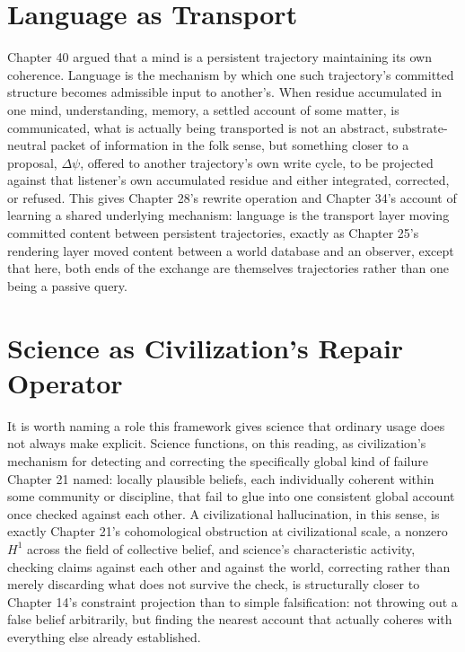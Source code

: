 \section{Language as Transport}

Chapter 40 argued that a mind is a persistent trajectory maintaining its own coherence. Language is the mechanism by which one such trajectory's committed structure becomes admissible input to another's. When residue accumulated in one mind, understanding, memory, a settled account of some matter, is communicated, what is actually being transported is not an abstract, substrate-neutral packet of information in the folk sense, but something closer to a proposal, \(\Delta\psi\), offered to another trajectory's own write cycle, to be projected against that listener's own accumulated residue and either integrated, corrected, or refused. This gives Chapter 28's rewrite operation and Chapter 34's account of learning a shared underlying mechanism: language is the transport layer moving committed content between persistent trajectories, exactly as Chapter 25's rendering layer moved content between a world database and an observer, except that here, both ends of the exchange are themselves trajectories rather than one being a passive query.

\section{Science as Civilization's Repair Operator}

It is worth naming a role this framework gives science that ordinary usage does not always make explicit. Science functions, on this reading, as civilization's mechanism for detecting and correcting the specifically global kind of failure Chapter 21 named: locally plausible beliefs, each individually coherent within some community or discipline, that fail to glue into one consistent global account once checked against each other. A civilizational hallucination, in this sense, is exactly Chapter 21's cohomological obstruction at civilizational scale, a nonzero \(H^1\) across the field of collective belief, and science's characteristic activity, checking claims against each other and against the world, correcting rather than merely discarding what does not survive the check, is structurally closer to Chapter 14's constraint projection than to simple falsification: not throwing out a false belief arbitrarily, but finding the nearest account that actually coheres with everything else already established.


